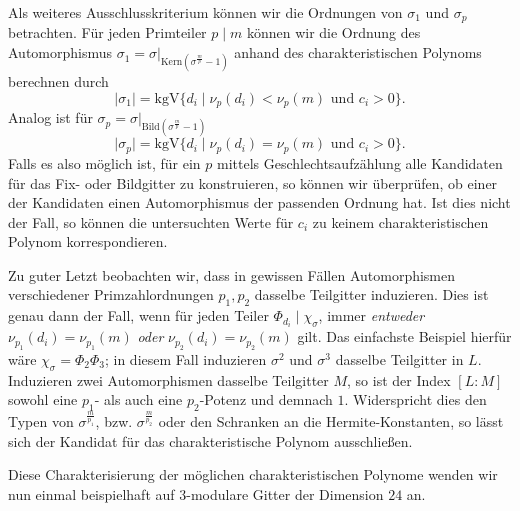 \documentclass[12pt,a4paper,halfparskip,headsepline,bibtotocnumbered]{scrreprt}
\theoremstyle{nummermitklammern}
\theoremstyle{nonumberbreak}
\newcommand{\Kern}{\text{Kern}}
\newcommand{\Bild}{\text{Bild}}
\newcommand{\kgV}{\text{kgV}}
\begin{document}
Als weiteres Ausschlusskriterium können wir die Ordnungen von $\sigma_1$ und $\sigma_p$ betrachten. Für jeden Primteiler $p \mid m$ können wir die Ordnung des Automorphismus $\sigma_1 = \sigma\vert_{\Kern(\sigma^\frac{m}{p}-1)}$ anhand des charakteristischen Polynoms berechnen durch
\[\vert \sigma_1 \vert = \kgV \lbrace d_i \mid \nu_p(d_i) < \nu_p(m) \text{ und } c_i > 0 \rbrace.\]
Analog ist für $\sigma_p = \sigma\vert_{\Bild(\sigma^\frac{m}{p}-1)}$
\[\vert \sigma_p \vert = \kgV \lbrace d_i \mid \nu_p(d_i) = \nu_p(m) \text{ und } c_i > 0 \rbrace.\]
Falls es also möglich ist, für ein $p$ mittels Geschlechtsaufzählung alle Kandidaten für das Fix- oder Bildgitter zu konstruieren, so können wir überprüfen, ob einer der Kandidaten einen Automorphismus der passenden Ordnung hat. Ist dies nicht der Fall, so können die untersuchten Werte für $c_i$ zu keinem charakteristischen Polynom korrespondieren.\par
Zu guter Letzt beobachten wir, dass in gewissen Fällen Automorphismen verschiedener Primzahlordnungen $p_1, p_2$ dasselbe Teilgitter induzieren. Dies ist genau dann der Fall, wenn für jeden Teiler $\Phi_{d_i} \mid \chi_\sigma$, immer \textit{entweder} $\nu_{p_1}(d_i) = \nu_{p_1}(m)$ \textit{oder} $\nu_{p_2}(d_i) = \nu_{p_2}(m)$ gilt. Das einfachste Beispiel hierfür wäre $\chi_\sigma = \Phi_2 \Phi_3$; in diesem Fall induzieren $\sigma^2$ und $\sigma^3$ dasselbe Teilgitter in $L$. Induzieren zwei Automorphismen dasselbe Teilgitter $M$, so ist der Index $[L : M]$ sowohl eine $p_1$- als auch eine $p_2$-Potenz und demnach $1$. Widerspricht dies den Typen von $\sigma^\frac{m}{p_1}$, bzw. $\sigma^\frac{m}{p_2}$ oder den Schranken an die Hermite-Konstanten, so lässt sich der Kandidat für das charakteristische Polynom ausschließen.

Diese Charakterisierung der möglichen charakteristischen Polynome wenden wir nun einmal beispielhaft auf $3$-modulare Gitter der Dimension $24$ an.
\end{document}
